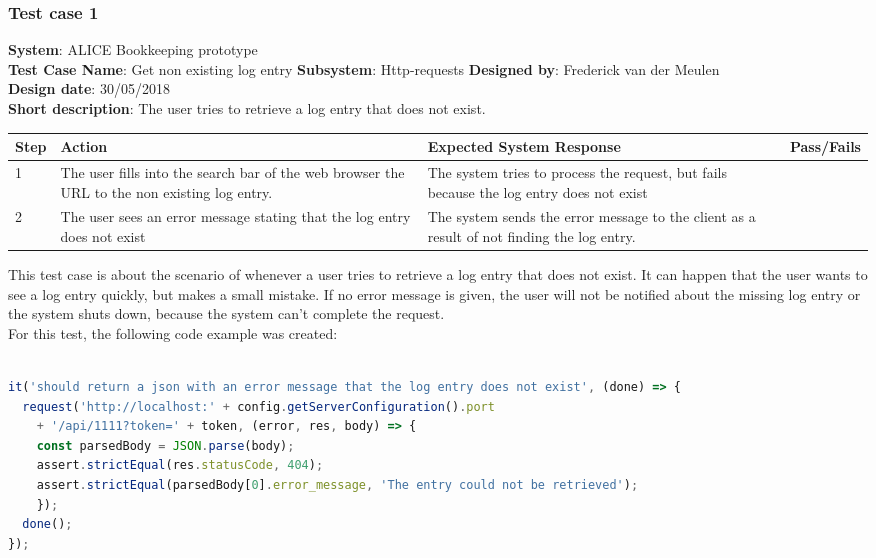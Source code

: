 \documentclass[paper=a4, fontsize=11pt,twoside]{scrartcl}	%
\begin{document}
\subsubsection{Test case 1}
\textbf{System}:  ALICE Bookkeeping prototype \\
\textbf{Test Case Name}:  Get non existing log entry
\textbf{Subsystem}:  Http-requests
\textbf{Designed by}:  Frederick van der Meulen\\
\textbf{Design date}: 30/05/2018 \\
\textbf{Short description}: The user tries to retrieve a log entry that does not exist. \\

\begin{longtable}{ | p{0.8cm} | p{4.5cm} | p{6cm}  | p{1.5cm} |}
\hline
Step & Action & Expected System Response & Pass/Fails  \\ \hline
1 & The user fills into the search bar of the web browser the URL to the non existing log entry. & The system tries to process the request, but fails because the log entry does not exist &  \\ \hline
2 & The user sees an error message stating that the log entry does not exist & The system sends the error message to the client as a result of not finding the log entry. &  \\ \hline
\end{longtable}
This test case is about the scenario of whenever a user tries to retrieve a log entry that does not exist. It can happen that the user wants to see a log entry quickly, but makes a small mistake. If no error message is given, the user will not be notified about the missing log entry or the system shuts down, because the system can't complete the request. \\ 
For this test, the following code example was created: \\ \\
\begin{lstlisting}[language=JavaScript, frame=single]
it('should return a json with an error message that the log entry does not exist', (done) => {
  request('http://localhost:' + config.getServerConfiguration().port
    + '/api/1111?token=' + token, (error, res, body) => {
    const parsedBody = JSON.parse(body);
    assert.strictEqual(res.statusCode, 404);
    assert.strictEqual(parsedBody[0].error_message, 'The entry could not be retrieved');
    });
  done();
});

\end{lstlisting}
\end{document}
